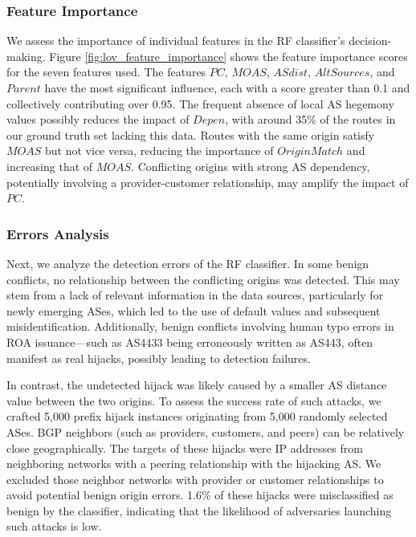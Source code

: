 \subsubsection{Feature Importance} \label{subsubsec:lov_feature_importance}
We assess the importance of individual features in the RF classifier's decision-making. Figure \ref{fig:lov_feature_importance} shows the feature importance scores for the seven features used. The features $PC$, $MOAS$, $ASdist$, $AltSources$, and $Parent$ have the most significant influence, each with a score greater than 0.1 and collectively contributing over 0.95. The frequent absence of local AS hegemony values possibly reduces the impact of $Depen$, with around 35\% of the routes in our ground truth set lacking this data.
Routes with the same origin satisfy $MOAS$ but not vice versa, reducing the importance of $OriginMatch$ and increasing that of $MOAS$. Conflicting origins with strong AS dependency, potentially involving a provider-customer relationship, may amplify the impact of $PC$.



\vspace{-8pt}
\subsubsection{Errors Analysis}
Next, we analyze the detection errors of the RF classifier.
In some benign conflicts, no relationship between the conflicting origins was detected. This may stem from a lack of relevant information in the data sources, particularly for newly emerging ASes, which led to the use of default values and subsequent misidentification.
Additionally, benign conflicts involving human typo errors in ROA issuance—such as AS4433 being erroneously written as AS443, often manifest as real hijacks, possibly leading to detection failures.

In contrast, the undetected hijack was likely caused by a smaller AS distance value between the two origins. To assess the success rate of such attacks, we crafted 5,000 prefix hijack instances originating from 5,000 randomly selected ASes.
BGP neighbors (such as providers, customers, and peers) can be relatively close geographically. The targets of these hijacks were IP addresses from neighboring networks with a peering relationship with the hijacking AS.
We excluded those neighbor networks with provider or customer relationships to avoid potential benign origin errors. 1.6\% of these hijacks were misclassified as benign by the classifier, indicating that the likelihood of adversaries launching such attacks is low.


